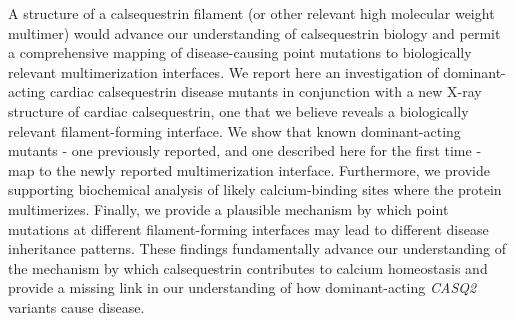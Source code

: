 A structure of a calsequestrin filament (or other relevant high molecular weight multimer) would advance our understanding of calsequestrin biology and permit a comprehensive mapping of disease-causing point mutations to biologically relevant multimerization interfaces. We report here an investigation of dominant-acting cardiac calsequestrin disease mutants in conjunction with a new X-ray structure of cardiac calsequestrin, one that we believe reveals a biologically relevant filament-forming interface. We show that known dominant-acting mutants - one previously reported, and one described here for the first time - map to the newly reported multimerization interface. Furthermore, we provide supporting biochemical analysis of likely calcium-binding sites where the protein multimerizes. Finally, we provide a plausible mechanism by which point mutations at different filament-forming interfaces may lead to different disease inheritance patterns. These findings fundamentally advance our understanding of the mechanism by which calsequestrin contributes to calcium homeostasis and provide a missing link in our understanding of how dominant-acting \textit{CASQ2} variants cause disease.

\subsection{\headingsubsectionone}

